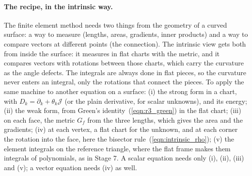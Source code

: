 \paragraph{The recipe, in the intrinsic way.} The finite element method needs two things from the geometry of a curved surface: a way to measure (lengths, areas, gradients, inner products) and a way to compare vectors at different points (the connection). The intrinsic view gets both from inside the surface: it measures in flat charts with the metric, and it compares vectors with rotations between those charts, which carry the curvature as the angle defects. The integrals are always done in flat pieces, so the curvature never enters an integral, only the rotations that connect the pieces. To apply the same machine to another equation on a surface: (i) the strong form in a chart, with $D_k = \partial_k + \theta_k\mathcal J$ (or the plain derivative, for scalar unknowns), and its energy; (ii) the weak form, from Green's identity~(\ref{eqn:r3_green}) in the flat chart; (iii) on each face, the metric $G_f$ from the three lengths, which gives the area and the gradients; (iv) at each vertex, a flat chart for the unknown, and at each corner the rotation into the face, here the bisector rule~(\ref{eqn:intrinsic_rho}); (v) the element integrals on the reference triangle, where the flat frame makes them integrals of polynomials, as in Stage 7. A scalar equation needs only (i), (ii), (iii) and (v); a vector equation needs (iv) as well.

